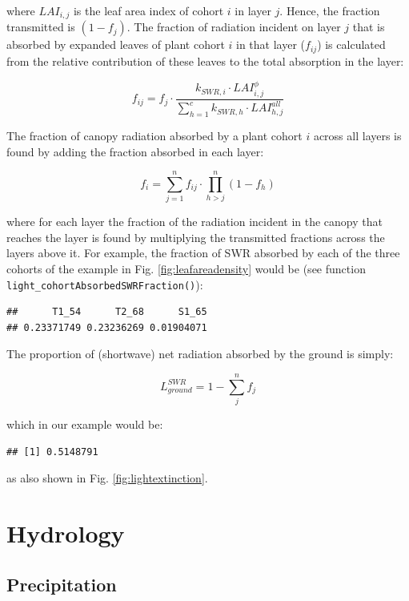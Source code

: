 \documentclass[]{book}
\begin{document}
where \(LAI_{i,j}\) is the leaf area index of cohort \(i\) in layer
\(j\). Hence, the fraction transmitted is \((1-f_j)\). The fraction of
radiation incident on layer \(j\) that is absorbed by expanded leaves of
plant cohort \(i\) in that layer (\(f_{ij}\)) is calculated from the
relative contribution of these leaves to the total absorption in the
layer:

\begin{equation}
f_{ij} = f_j \cdot \frac{k_{SWR,i}\cdot LAI_{i,j}^{\phi}}{\sum_{h=1}^{c}{k_{SWR,h} \cdot LAI_{h,j}^{all}}}
\end{equation}

The fraction of canopy radiation absorbed by a plant cohort \(i\) across
all layers is found by adding the fraction absorbed in each layer:

\begin{equation}
f_i = \sum_{j=1}^{n}{f_{ij}\cdot \prod_{h>j}^{n}{(1-f_h)}}
\end{equation}

where for each layer the fraction of the radiation incident in the
canopy that reaches the layer is found by multiplying the transmitted
fractions across the layers above it. For example, the fraction of SWR
absorbed by each of the three cohorts of the example in Fig.
\ref{fig:leafareadensity} would be (see function
\texttt{light\_cohortAbsorbedSWRFraction()}):

\begin{verbatim}
##      T1_54      T2_68      S1_65 
## 0.23371749 0.23236269 0.01904071
\end{verbatim}

The proportion of (shortwave) net radiation absorbed by the ground is
simply:

\begin{equation}
L^{SWR}_{ground} = 1 - \sum_{j}^{n}{f_j}
\end{equation}

which in our example would be:

\begin{verbatim}
## [1] 0.5148791
\end{verbatim}

as also shown in Fig. \ref{fig:lightextinction}.

\chapter{Hydrology}\label{hydrology}

\section{Precipitation}\label{precipitation}
\end{document}
